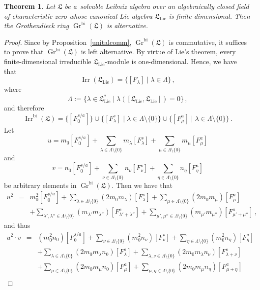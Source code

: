 \documentclass[10pt,a4paper]{amsart}
\newtheorem{theorem}{Theorem}
\DeclareMathOperator{\K}{Gr}
\DeclareMathOperator{\bi}{bi}
\DeclareMathOperator{\irr}{Irr}
\newcommand{\lf}{\mathfrak{L}}
\DeclareMathOperator{\lie}{Lie}
\begin{document}
	\begin{theorem}\label{alt}
		Let $\lf$ be a~solvable Leibniz algebra over an algebraically closed field of characteristic zero whose canonical Lie algebra $\lf_{\lie}$ is finite dimensional. Then the Grothendieck ring $\K^{\bi}(\lf)$ is alternative.
	\end{theorem}

	\begin{proof}
		Since by Proposition~\ref{unitalcomm}, $\K^{\bi}(\lf)$ is commutative, it suffices to prove that $\K^{\bi}(\lf)$ is left alternative. By virtue of Lie's theorem, every finite-dimensional irreducible $\lf_{\lie}$-module is one-dimensional. Hence, we have that
		\[
			\irr(\lf_{\lie})=\{[F_\lambda]\mid\lambda\in\Lambda\}\,,
		\]
		where
		\[
			\Lambda:=\{\lambda\in\lf_{\lie}^*\mid\lambda([\lf_{\lie},\lf_{\lie}])=0\}\,,
		\]
		and therefore
		\[
			\irr^{\bi}(\lf)=\{[F_0^{s/a}]\}\cup\{[F_\lambda^s ]\mid\lambda\in\Lambda\setminus\{0\}\}
			\cup\{[F_\mu^a ]\mid\lambda\in\Lambda\setminus\{0\}\}\,.
		\]
		Let
		\[
			u=m_0 [F_0^{s/a}]+\sum_{\lambda\in\Lambda\setminus\{0\}}m_\lambda[F_\lambda^s ]
			+\sum_{\mu\in\Lambda\setminus\{0\}}m_\mu[F_\mu^a ]
		\]
		and
		\[
			v=n_0 [F_0^{s/a}]+\sum_{\nu\in\Lambda\setminus\{0\}}n_\nu[F_\nu^s ]
			+\sum_{\eta\in\Lambda\setminus\{0\}}n_\eta[F_\eta^a ]
		\]
		be arbitrary elements in $\K^{\bi}(\lf)$. Then we have that
		\begin{eqnarray*}
			u^2 & = & m_0^2 [F_0^{s/a}]+\sum_{\lambda\in\Lambda\setminus\{0\}}(2m_0 m_\lambda)
			[F_\lambda^s ]+\sum_{\mu\in\Lambda\setminus\{0\}}(2m_0 m_\mu)[F_\mu^a ]\\
			&& +\sum_{\lambda',\lambda''\in\Lambda\setminus\{0\}}(m_{\lambda'}m_{\lambda''})
			[F_{\lambda'+\lambda''}^s ]+\sum_{\mu',\mu''\in\Lambda\setminus\{0\}}
			(m_{\mu'}m_{\mu''})[F_{\mu'+\mu''}^a ]\,,
		\end{eqnarray*}
		and thus
		\begin{eqnarray*}
			u^2\cdot v & = & (m_0^2 n_0 )[F_0^{s/a}]+\sum_{\nu\in\Lambda\setminus\{0\}}(m_0^2 n_\nu)
			[F_\nu^s ]+\sum_{\eta\in\Lambda\setminus\{0\}}(m_0^2 n_\eta)[F_\eta^a ]\\
			&& +\sum_{\lambda\in\Lambda\setminus\{0\}}(2m_0 m_\lambda n_0 )[F_\lambda^s ]
			+\sum_{\lambda,\nu\in\Lambda\setminus\{0\}}(2m_0 m_\lambda n_\nu)[F_{\lambda+\nu}^s ]\\
			&& +\sum_{\mu\in\Lambda\setminus\{0\}}(2m_0 m_\mu n_0 )[F_\mu^a ]
			+\sum_{\mu,\eta\in\Lambda\setminus\{0\}}(2m_0 m_\mu n_\eta)[F_{\mu+\eta}^a ]\\

\end{eqnarray*}
\end{proof}
\end{document}
